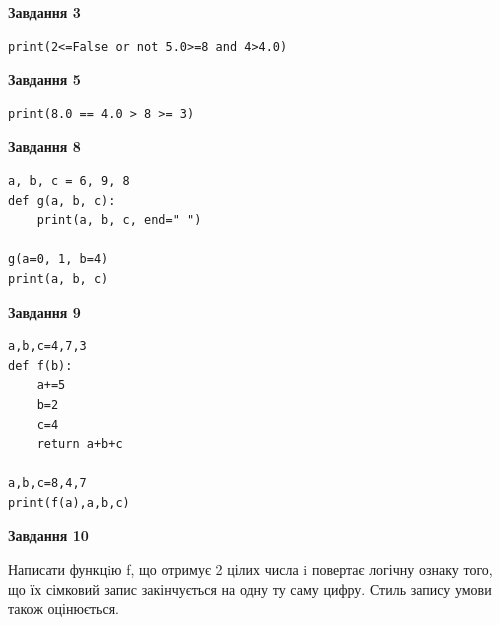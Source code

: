 \documentclass[12pt, ukrainian]{article}
\begin{document}
{\begin {large}
\begin{minipage}[t]{7.5cm}
\end{minipage}
\vline \hspace{6mm}
\begin{minipage}[t]{10.5cm}

\begin{center}
\textbf{Завдання 3}
\end{center}

\begin{verbatim}
print(2<=False or not 5.0>=8 and 4>4.0)
\end{verbatim}



\begin{center}
\textbf{Завдання 5}
\end{center}

\begin{verbatim}
print(8.0 == 4.0 > 8 >= 3)
\end{verbatim}



\begin{center}
\textbf{Завдання 8}
\end{center}

\begin{verbatim}
a, b, c = 6, 9, 8
def g(a, b, c):
    print(a, b, c, end=" ")

g(a=0, 1, b=4)
print(a, b, c)
\end{verbatim}



\begin{center}
\textbf{Завдання 9}
\end{center}

\begin{verbatim}
a,b,c=4,7,3
def f(b):
    a+=5
    b=2
    c=4
    return a+b+c

a,b,c=8,4,7
print(f(a),a,b,c)
\end{verbatim}



\begin{center}
\textbf{Завдання 10}
\end{center}

Написати функцiю f, що отримує 2 цілих числа i повертає логічну ознаку того, що їх сімковий запис закінчується на одну ту саму цифру. Стиль запису умови також оцінюється.\par

\end{minipage}

\end {large}}
\newpage
\end{document}

